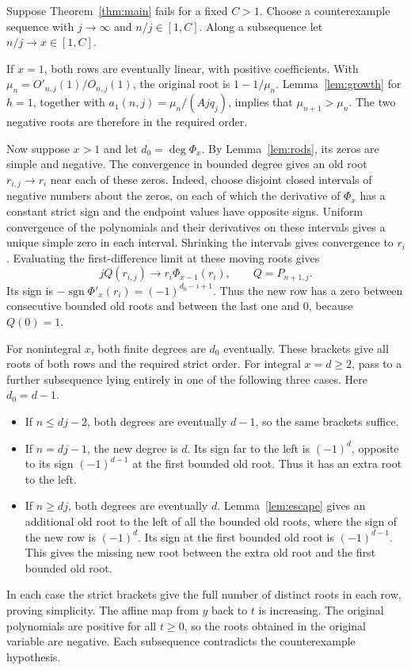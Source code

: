 \documentclass[11pt]{article}
\begin{document}
Suppose Theorem~\ref{thm:main} fails for a fixed \(C>1\). Choose a counterexample sequence with \(j\to\infty\) and \(n/j\in[1,C]\). Along a subsequence let \(n/j\to x\in[1,C]\).

If \(x=1\), both rows are eventually linear, with positive coefficients. With \(\mu_n=O'_{n,j}(1)/O_{n,j}(1)\), the original root is \(1-1/\mu_n\). Lemma~\ref{lem:growth} for \(h=1\), together with \(a_1(n,j)=\mu_n/(Ajq_j)\), implies that \(\mu_{n+1}>\mu_n\). The two negative roots are therefore in the required order.

Now suppose \(x>1\) and let \(d_0=\deg\Phi_x\). By Lemma~\ref{lem:rods}, its zeros are simple and negative. The convergence in bounded degree gives an old root \(r_{i,j}\to r_i\) near each of these zeros. Indeed, choose disjoint closed intervals of negative numbers about the zeros, on each of which the derivative of \(\Phi_x\) has a constant strict sign and the endpoint values have opposite signs. Uniform convergence of the polynomials and their derivatives on these intervals gives a unique simple zero in each interval. Shrinking the intervals gives convergence to \(r_i\). Evaluating the first-difference limit at these moving roots gives
\[
 jQ(r_{i,j})\longrightarrow r_i\Phi_{x-1}(r_i),\qquad Q=P_{n+1,j}.
\]
Its sign is \(-\operatorname{sgn}\Phi'_x(r_i)=(-1)^{d_0-i+1}\). Thus the new row has a zero between consecutive bounded old roots and between the last one and \(0\), because \(Q(0)=1\).

For nonintegral \(x\), both finite degrees are \(d_0\) eventually. These brackets give all roots of both rows and the required strict order. For integral \(x=d\ge2\), pass to a further subsequence lying entirely in one of the following three cases. Here \(d_0=d-1\).
\begin{itemize}
 \item If \(n\le dj-2\), both degrees are eventually \(d-1\), so the same brackets suffice.
 \item If \(n=dj-1\), the new degree is \(d\). Its sign far to the left is \((-1)^d\), opposite to its sign \((-1)^{d-1}\) at the first bounded old root. Thus it has an extra root to the left.
 \item If \(n\ge dj\), both degrees are eventually \(d\). Lemma~\ref{lem:escape} gives an additional old root to the left of all the bounded old roots, where the sign of the new row is \((-1)^d\). Its sign at the first bounded old root is \((-1)^{d-1}\). This gives the missing new root between the extra old root and the first bounded old root.
\end{itemize}
In each case the strict brackets give the full number of distinct roots in each row, proving simplicity. The affine map from \(y\) back to \(t\) is increasing. The original polynomials are positive for all \(t\ge0\), so the roots obtained in the original variable are negative. Each subsequence contradicts the counterexample hypothesis.
\end{document}

